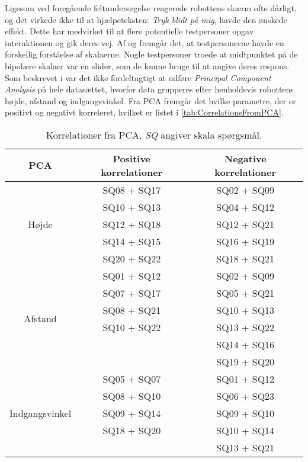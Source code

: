 Ligesom ved foregående feltundersøgelse reagerede robottens skærm ofte dårligt, og det virkede ikke til at hjælpeteksten: \textit{Tryk blidt på mig}, havde den ønskede effekt. Dette har medvirket til at flere potentielle testpersoner opgav interaktionen og gik deres vej.\blankline
%
Af  og  fremgår det, at testpersonerne havde en forskellig forståelse af skalaerne. Nogle testpersoner troede at midtpunktet på de bipolære skalaer var en slider, som de kunne bruge til at angive deres respons. \blankline 
%
Som beskrevet i  var det ikke fordeltagtigt at udføre \textit{Principal Component Analysis} på hele datasættet, hvorfor data grupperes efter henholdsvis robottens højde, afstand og indgangsvinkel. Fra PCA fremgår det hvilke parametre, der er positivt og negativt korreleret, hvilket er listet i \autoref{tab:CorrelationsFromPCA}. 
%
\begin{table}[H]
	\centering
	\begin{tabular}{ c|c|c }
		\centering
		PCA & Positive korrelationer & Negative korrelationer \\ \hline
		\multirow{5}{*}{Højde} & SQ08  + SQ17 & SQ02  + SQ09 \\
		& SQ10 + SQ13 & SQ04 + SQ12 \\
		& SQ12 + SQ18 & SQ12 + SQ21 \\
		& SQ14 + SQ15 & SQ16 + SQ19 \\
		& SQ20 + SQ22 & SQ18 + SQ21\\ \hline
		\multirow{6}{*}{Afstand} & SQ01 + SQ12 & SQ02 + SQ09 \\
		& SQ07 + SQ17 & SQ05 + SQ21 \\
		& SQ08 + SQ21 & SQ10 + SQ13 \\
		& SQ10 + SQ22 & SQ13 + SQ22 \\
		&  & SQ14 + SQ16 \\	
		&  & SQ19 + SQ20 \\ \hline	
		\multirow{5}{*}{Indgangsvinkel} 
		& SQ05 + SQ07 & SQ01 + SQ12 \\
		& SQ08 + SQ10 & SQ06 + SQ23 \\
		& SQ09 + SQ14 & SQ09 + SQ10 \\
		& SQ18 + SQ20 & SQ10 + SQ14 \\
		&  & SQ13 + SQ21
	\end{tabular}        
\caption{Korrelationer fra PCA, \textit{SQ} angiver skala spørgsmål.}
\label{tab:CorrelationsFromPCA}
\end{table}
\noindent
